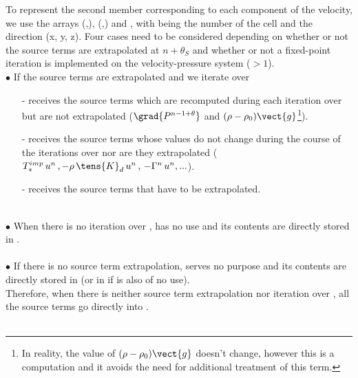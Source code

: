 To represent the second member corresponding to each component of the velocity, we use the arrays (,), (,) and , with  being the number of the cell and  the direction (x, y, z). Four cases need to be considered depending on whether or not the source terms are extrapolated at $n+\theta_S$ and whether or not a fixed-point iteration is implemented on the velocity-pressure system ($>1$).
\\
$\bullet$ If the source terms are extrapolated and we iterate over \\
\begin{itemize}
\item [-] receives the source terms which are recomputed during each iteration over  but are not extrapolated
($\grad{P^{n-1+\theta}}$ and $(\rho -\rho_0) \vect {g}$\footnote{In reality, the value of
$(\rho -\rho_0) \vect {g}$ doesn't change, however this is a computation and it avoids the need for additional treatment of this term.}).\\
\item [-] receives the source terms whose values do not change during the course of the iterations over  nor are they extrapolated
($T_s^{imp}\,u^n\,,-\rho\,\tens{K}_{d}\,u^n\,,\,-\Gamma^n\,u^n,...$).\\
\item [-] receives the source terms that have to be extrapolated.\\
\\
\end{itemize}
$\bullet$ When there is no iteration over ,  has no use and its contents are directly stored in .\\
\\
$\bullet$ If there is no source term extrapolation,  serves no purpose and its contents are directly stored in  (or in  if  is also of no use).\\
Therefore, when there is neither source term extrapolation nor iteration over , all the source terms go directly into .\\
\\
